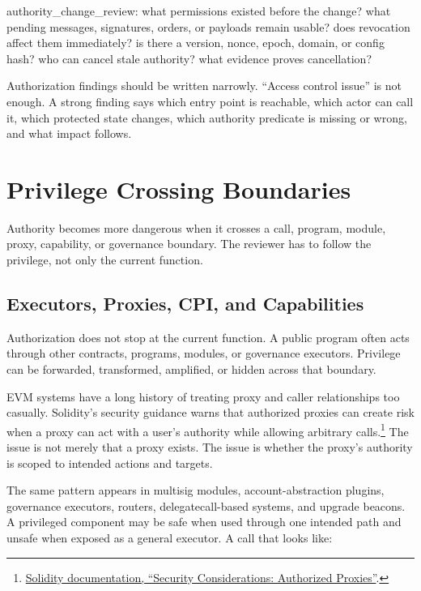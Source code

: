 \begin{codeblock}
authority_change_review:
    what permissions existed before the change?
    what pending messages, signatures, orders, or payloads remain usable?
    does revocation affect them immediately?
    is there a version, nonce, epoch, domain, or config hash?
    who can cancel stale authority?
    what evidence proves cancellation?
\end{codeblock}

Authorization findings should be written narrowly. ``Access control issue'' is not enough. A strong finding says which entry point is reachable, which actor can call it, which protected state changes, which authority predicate is missing or wrong, and what impact follows.

\section{Privilege Crossing Boundaries}

Authority becomes more dangerous when it crosses a call, program, module, proxy, capability, or governance boundary. The reviewer has to follow the privilege, not only the current function.

\subsection{Executors, Proxies, CPI, and Capabilities}

Authorization does not stop at the current function. A public program often acts through other contracts, programs, modules, or governance executors. Privilege can be forwarded, transformed, amplified, or hidden across that boundary.

EVM systems have a long history of treating proxy and caller relationships too casually. Solidity's security guidance warns that authorized proxies can create risk when a proxy can act with a user's authority while allowing arbitrary calls.\footnote{\href{https://docs.soliditylang.org/en/latest/security-considerations.html\#authorized-proxies}{Solidity documentation, ``Security Considerations: Authorized Proxies''}.} The issue is not merely that a proxy exists. The issue is whether the proxy's authority is scoped to intended actions and targets.

The same pattern appears in multisig modules, account-abstraction plugins, governance executors, routers, delegatecall-based systems, and upgrade beacons. A privileged component may be safe when used through one intended path and unsafe when exposed as a general executor. A call that looks like:


